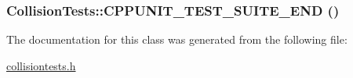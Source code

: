 \label{classCollisionTests_a542155fcf2acb7a46506e5924f32de86}
\hypertarget{classCollisionTests_ad9399d823f41c3dcf60d83b3d7b96574}{
\subsubsection[{CPPUNIT\_\-TEST\_\-SUITE\_\-END}]{\setlength{\rightskip}{0pt plus 5cm}CollisionTests::CPPUNIT\_\-TEST\_\-SUITE\_\-END ()}}
\label{classCollisionTests_ad9399d823f41c3dcf60d83b3d7b96574}


The documentation for this class was generated from the following file:\begin{DoxyCompactItemize}
\item 
\hyperlink{collisiontests_8h}{collisiontests.h}\end{DoxyCompactItemize}
